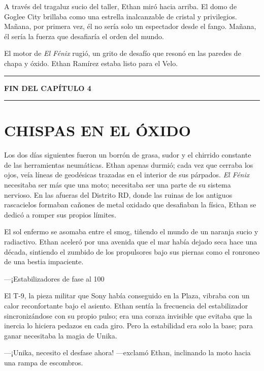 \documentclass[12pt,a4paper]{book}
\begin{document}
A través del tragaluz sucio del taller, Ethan miró hacia arriba. El domo de Goglee City brillaba como una estrella inalcanzable de cristal y privilegios. Mañana, por primera vez, él no sería solo un espectador desde el fango. Mañana, él sería la fuerza que desafiaría el orden del mundo.

El motor de \textit{El Fénix} rugió, un grito de desafío que resonó en las paredes de chapa y óxido. Ethan Ramírez estaba listo para el Velo.

\bigskip
\noindent\rule{\textwidth}{0.4pt}
\bigskip

\textbf{FIN DEL CAPÍTULO 4}


\bigskip
\noindent\rule{\textwidth}{0.4pt}
\bigskip

\chapter{CHISPAS EN EL ÓXIDO}

Los dos días siguientes fueron un borrón de grasa, sudor y el chirrido constante de las herramientas neumáticas. Ethan apenas durmió; cada vez que cerraba los ojos, veía líneas de geodésicas trazadas en el interior de sus párpados. \textit{El Fénix} necesitaba ser más que una moto; necesitaba ser una parte de su sistema nervioso. En las afueras del Distrito RD, donde las ruinas de los antiguos rascacielos formaban cañones de metal oxidado que desafiaban la física, Ethan se dedicó a romper sus propios límites.

El sol enfermo se asomaba entre el smog, tiñendo el mundo de un naranja sucio y radiactivo. Ethan aceleró por una avenida que el mar había dejado seca hace una década, sintiendo el zumbido de los propulsores bajo sus piernas como el ronroneo de una bestia impaciente.

---¡Estabilizadores de fase al 100%

El T-9, la pieza militar que Sony había conseguido en la Plaza, vibraba con un calor reconfortante bajo el asiento. Ethan sentía la frecuencia del estabilizador sincronizándose con su propio pulso; era una coraza invisible que evitaba que la inercia lo hiciera pedazos en cada giro. Pero la estabilidad era solo la base; para ganar necesitaba la magia de Unika.

---¡Unika, necesito el desfase ahora! ---exclamó Ethan, inclinando la moto hacia una rampa de escombros.
\end{document}
